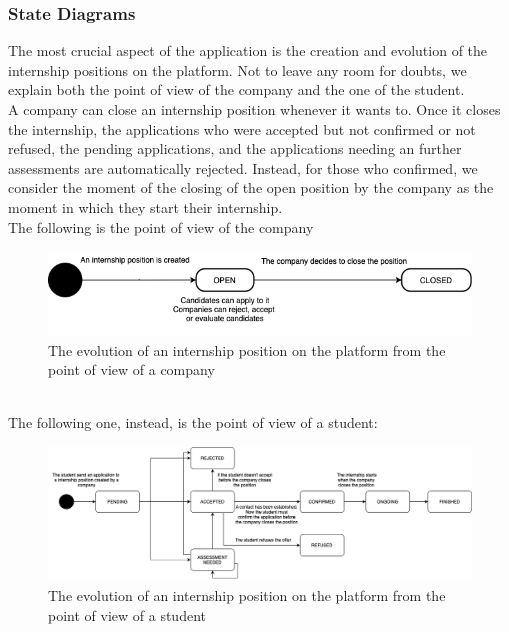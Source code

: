     \subsubsection{State Diagrams}
        The most crucial aspect of the application is the creation and evolution of the internship positions on the platform. Not to leave any room for doubts, we explain both the point of view of the company and the one of the student.
        \\
        A company can close an internship position whenever it wants to. Once it closes the internship, the applications who were accepted but not confirmed or not refused, the pending applications, and the applications needing an further assessments are automatically rejected. Instead, for those who confirmed, we consider the moment of the closing of the open position by the company as the moment in which they start their internship.
        \\
        The following is the point of view of the company
        \begin{figure}[h!]
            \centering
            \includegraphics[width=1\textwidth]{RASD/Images/CompanyPOV.png}
            \caption{The evolution of an internship position on the platform from the point of view of a company}
            \label{fig:example}
        \end{figure}
        \\
        The following one, instead, is the point of view of a student:
        \begin{figure}[h!]
            \centering
            \includegraphics[width=1\textwidth]{RASD/Images/StudentPOV.png}
            \caption{The evolution of an internship position on the platform from the point of view of a student}
            \label{fig:example}
        \end{figure}
        

